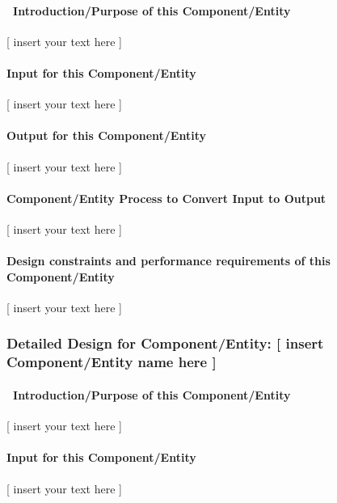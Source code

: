 \documentclass[twoside,letterpaper]{article}
\begin{document}
\paragraph[\ Introduction/Purpose of this
Component/Entity]{\ Introduction/Purpose of this Component/Entity}
{\color{black}
[ insert your text here ]}

\paragraph[Input for this Component/Entity]{Input for this
Component/Entity}
{\color{black}
[ insert your text here ]}

\paragraph{Output for this Component/Entity}
{\color{black}
[ insert your text here ]}

\paragraph{Component/Entity Process to Convert Input to Output}
{\color{black}
[ insert your text here ]}

\paragraph{Design constraints and performance requirements of this
Component/Entity}
{\color{black}
[ insert your text here ]}

\subsubsection{Detailed Design for Component/Entity: [ insert
Component/Entity name here ]}
\paragraph[\ Introduction/Purpose of this
Component/Entity]{\ Introduction/Purpose of this Component/Entity}
{\color{black}
[ insert your text here ]}

\paragraph{Input for this Component/Entity}
{\color{black}
[ insert your text here ]}
\end{document}
